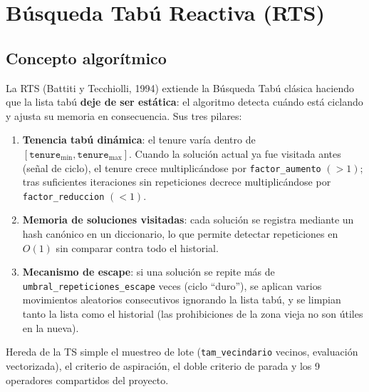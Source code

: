 \section{Búsqueda Tabú Reactiva (RTS)}
\label{sec:mh-rts}

\subsection{Concepto algorítmico}
La RTS (Battiti y Tecchiolli, 1994) extiende la Búsqueda Tabú clásica haciendo
que la lista tabú \textbf{deje de ser estática}: el algoritmo detecta cuándo
está ciclando y ajusta su memoria en consecuencia. Sus tres pilares:

\begin{enumerate}
  \item \textbf{Tenencia tabú dinámica}: el tenure varía dentro de
    $[\texttt{tenure}_{\min}, \texttt{tenure}_{\max}]$. Cuando la solución
    actual ya fue visitada antes (señal de ciclo), el tenure crece
    multiplicándose por \texttt{factor\_aumento} $(>1)$; tras
    suficientes iteraciones sin repeticiones decrece multiplicándose por
    \texttt{factor\_reduccion} $(<1)$.
  \item \textbf{Memoria de soluciones visitadas}: cada solución se registra
    mediante un hash canónico en un diccionario, lo que permite detectar
    repeticiones en $O(1)$ sin comparar contra todo el historial.
  \item \textbf{Mecanismo de escape}: si una solución se repite más de
    \texttt{umbral\_repeticiones\_escape} veces (ciclo ``duro''), se aplican
    varios movimientos aleatorios consecutivos ignorando la lista tabú, y se
    limpian tanto la lista como el historial (las prohibiciones de la zona
    vieja no son útiles en la nueva).
\end{enumerate}

Hereda de la TS simple el muestreo de lote (\texttt{tam\_vecindario} vecinos,
evaluación vectorizada), el criterio de aspiración, el doble criterio de
parada y los 9 operadores compartidos del proyecto.

